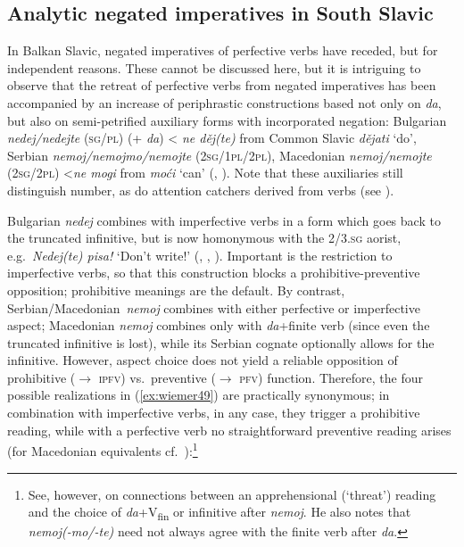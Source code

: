 \documentclass[output=paper,colorlinks,citecolor=brown]{langscibook}
\begin{document}
\subsection{Analytic negated imperatives in South Slavic}
\label{subsec:analyticnegimp}

In Balkan Slavic, negated imperatives of perfective verbs have receded, but for independent reasons. These cannot be discussed here, but it is intriguing to observe that the retreat of perfective verbs from negated imperatives has been accompanied by an increase of periphrastic constructions based not only on \textit{da}, but also on semi-petrified auxiliary forms with incorporated negation: Bulgarian \textit{nedej/nedejte} (\textsc{sg/pl}) (+ \textit{da}) < \textit{ne děj(te)} from Common Slavic \textit{dějati} `do', Serbian \textit{nemoj/nemojmo/nemojte} (\textsc{2sg/1pl/2pl}), Macedonian \textit{nemoj/nemojte} (\textsc{2sg/2pl}) <\textit{ne mogi} from \textit{moći} `can' (\citealt{Ivić1958}, \citealt{Sedláček1997}). Note that these auxiliaries still distinguish number, as do attention catchers derived from verbs (see ).


Bulgarian \textit{nedej} combines with imperfective verbs in a form which goes back to the truncated infinitive, but is now homonymous with the \textsc{2/3.sg} aorist, e.g.\ \textit{Nedej(te) pisa!} `Don't write!' (\citealt{Ivić1958}, \citealt{Sedláček1997}, \citealt[412]{Lindstedt2010}). Important is the restriction to imperfective verbs, so that this construction blocks a prohibitive-preventive opposition; prohibitive meanings are the default. By contrast, Serbian/Macedonian\ \textit{nemoj} combines with either perfective or imperfective aspect; Macedonian \textit{nemoj} combines only with \textit{da}+finite verb (since even the truncated infinitive is lost), while its Serbian cognate optionally allows for the infinitive. However, aspect choice does not yield a reliable opposition of prohibitive (${\rightarrow}$ \textsc{ipfv}) vs.\ preventive (${\rightarrow}$ \textsc{pfv}) function. Therefore, the four possible realizations in (\ref{ex:wiemer49}) are practically synonymous; in combination with imperfective verbs, in any case, they trigger a prohibitive reading, while with a perfective verb no straightforward preventive reading arises (for Macedonian equivalents cf.\ \citealt[345]{Tomić2012}):\footnote{See, however, \citet[400]{Szucsich2010} on connections between an apprehensional (`threat') reading and the choice of \textit{da}+V\textsubscript{fin} or infinitive after \textit{nemoj}. He also notes that \textit{nemoj(-mo/-te)} need not always  agree with the finite verb after \textit{da}.}
\end{document}
